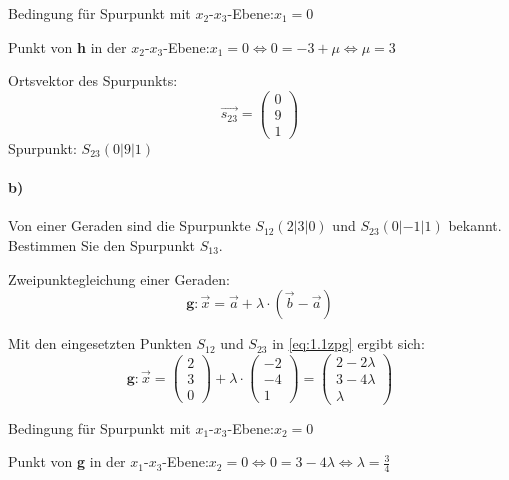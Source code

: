 \documentclass{ajc}
\numberwithin{equation}{subsection}
\begin{document}
	Bedingung für Spurpunkt mit $x_2$-$x_3$-Ebene:\quad $x_1 = 0$
	
	Punkt von \textbf{h} in der $x_2\text{-}x_3$-Ebene:\quad $x_1 = 0 \Leftrightarrow 0 = -3 + \mu \Leftrightarrow \mu = 3$
	
	Ortsvektor des Spurpunkts: 
	\begin{equation}
		\overrightarrow{s_\text{23}}=\left(\begin{array}{r} 0 \\ 9 \\ 1\end{array}\right)
	\end{equation}
	Spurpunkt: $S_\text{23}(0|9|1)$
	
	
	\paragraph{b)} Von einer Geraden sind die Spurpunkte $S_\text{12} (2|3|0)$ und \linebreak $S_\text{23} (0|-1|1)$ bekannt. Bestimmen Sie den Spurpunkt $S_\text{13}$.
	
	Zweipunktegleichung einer Geraden:
	\begin{equation}\label{eq:1.1zpg}
		\mathbf{g}: \overrightarrow{x}= \vec{a} + \lambda \cdot \left(\overrightarrow{b} - \overrightarrow{a}\right)
	\end{equation}
	
	Mit den eingesetzten Punkten $S_\text{12}$ und $S_\text{23}$ in \ref{eq:1.1zpg} ergibt sich:
	\begin{equation}\label{eq:1.1zpg_ein}
		\mathbf{g}: \overrightarrow{x}= \left(\begin{array}{r} 2 \\ 3 \\ 0\end{array}\right) + \lambda \cdot \left(\begin{array}{r} -2 \\ -4 \\ 1\end{array}\right) = \left(\begin{array}{r} 2 - 2\lambda \\ 3 - 4\lambda \\ \lambda\end{array}\right)
	\end{equation}
	
	Bedingung für Spurpunkt mit $x_1\text{-}x_3$-Ebene:\quad $x_2 = 0$
	
	Punkt von \textbf{g} in der $x_1\text{-}x_3$-Ebene:\quad $x_2 = 0 \Leftrightarrow 0 = 3 - 4\lambda \Leftrightarrow \lambda = \frac{3}{4}$
	
\end{document}

